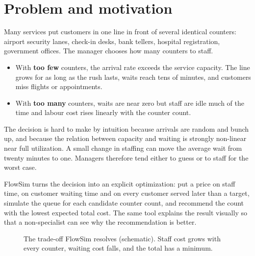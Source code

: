 \documentclass[11pt,a4paper]{article}
\begin{document}
\section{Problem and motivation}
Many services put customers in one line in front of several identical counters: airport security lanes, check-in
desks, bank tellers, hospital registration, government offices. The manager chooses how many counters to staff.
\begin{itemize}
  \item With \textbf{too few} counters, the arrival rate exceeds the service capacity. The line grows for as long as the
    rush lasts, waits reach tens of minutes, and customers miss flights or appointments.
  \item With \textbf{too many} counters, waits are near zero but staff are idle much of the time and labour cost rises
    linearly with the counter count.
\end{itemize}
The decision is hard to make by intuition because arrivals are random and bunch up, and because the relation between
capacity and waiting is strongly non-linear near full utilization. A small change in staffing can move the average wait
from twenty minutes to one. Managers therefore tend either to guess or to staff for the worst case.

FlowSim turns the decision into an explicit optimization: put a price on staff time, on customer waiting time and on
every customer served later than a target, simulate the queue for each candidate counter count, and recommend the count
with the lowest expected total cost. The same tool explains the result visually so that a non-specialist can see why the
recommendation is better.

\begin{figure}[H]
\centering
{}
\caption{The trade-off FlowSim resolves (schematic). Staff cost grows with every counter, waiting cost falls, and the
total has a minimum.}
\end{figure}
\end{document}

